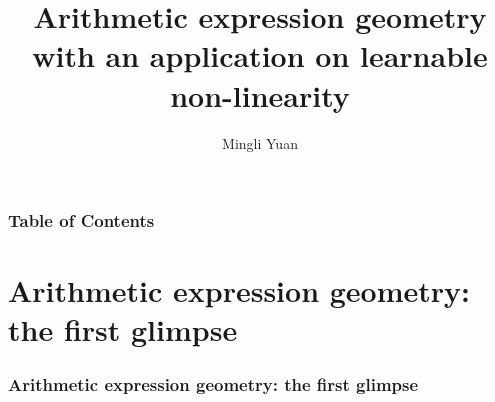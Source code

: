 \documentclass[aspectratio=169]{beamer}
\title{Arithmetic expression geometry \\ with an application on learnable non-linearity}
\author[Author] {Mingli Yuan}
\begin{document}
\pgfplotsset{compat=1.18}

\begin{frame}
\maketitle
\end{frame}

\begin{frame}
\frametitle{Table of Contents}
\tableofcontents
\end{frame}

\section{Arithmetic expression geometry: the first glimpse}\label{sec:arithmetic-expression-geometry:first-glimpse}

\begin{frame}
\frametitle{Arithmetic expression geometry: the first glimpse}
\begin{figure}[ht]\centering
{}
\end{figure}
\end{frame}
\end{document}
